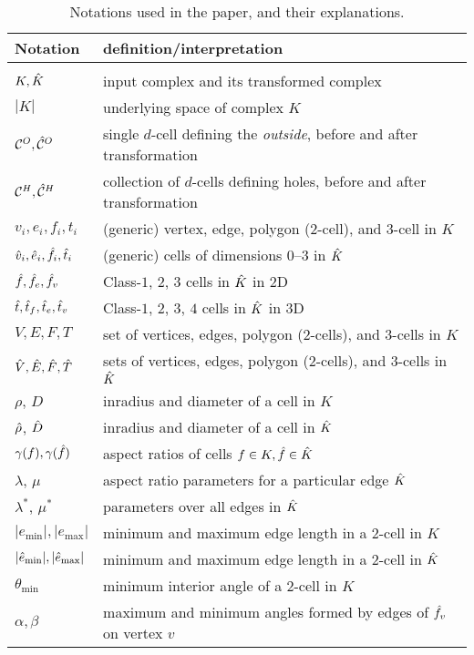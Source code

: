 \begin{table}[h!]
  \centering
  \caption{\label{tab:notation} Notations used in the paper, and their explanations.}
  \begin{tabular}{ll}
    \hline
    Notation & definition/interpretation \\    \hline
    \vspace*{-0.1in} \\
    $K, \hat{K}$     & input complex and its transformed complex \\
    $|K|$        & underlying space of complex $K$\\
    $\mathcal{C}^O, \hat{\mathcal{C}}^O$  & single $d$-cell defining the \emph{outside}, before and after transformation\\
    $\mathcal{C}^H, \hat{\mathcal{C}}^H$  & collection of $d$-cells defining holes, before and after transformation \\
    $v_i, e_i, f_i, t_i$ & (generic) vertex, edge, polygon ($2$-cell), and $3$-cell in $K$\\
    $\hat{v}_i, \hat{e}_i, \hat{f}_i, \hat{t}_i$ & (generic) cells of dimensions 0--3 in $\hat{K}$\\
    $\hat{f}, \hat{f}_e, \hat{f}_v$ & Class-$1$, $2$, $3$ cells in $\hat{K}$ in 2D \\
    $\hat{t}, \hat{t}_f, \hat{t}_e, \hat{t}_v$ & Class-$1$, $2$, $3$, $4$ cells in $\hat{K}$ in 3D\\
    $V, E, F, T$ & set of vertices, edges, polygon ($2$-cells), and $3$-cells in $K$ \\
    $\hat{V}, \hat{E}, \hat{F}, \hat{T}$ & sets of vertices, edges, polygon ($2$-cells), and $3$-cells in $\hat{K}$\\
    $\rho$, $D$ & inradius and diameter of a cell in $K$\\
    $\hat{\rho}$, $\hat{D}$ & inradius and diameter of a cell in $\hat{K}$\\ 
    $\gamma(f), \gamma(\hat{f})$ & aspect ratios of cells $f \in K, \hat{f} \in \hat{K}$ \\
    $\lambda$, $\mu$ & aspect ratio parameters for a particular edge $\hat{K}$ \\
    $\lambda^*$, $\mu^*$ & parameters over all edges in $\hat{K}$ \\
    $|e_{\min}|, |e_{\max}|$ & minimum and maximum edge length in a $2$-cell in $K$ \\
    $|\hat{e}_{\min}|, |\hat{e}_{\max}|$ & minimum and maximum edge length in a $2$-cell in $\hat{K}$\\
    $\theta_{\min}$ & minimum interior angle of a $2$-cell in $K$ \\
    $\alpha, \beta$ & maximum and minimum angles formed by edges of $\hat{f}_v$ on vertex $v$\\
    \hline
  \end{tabular}
\end{table}

